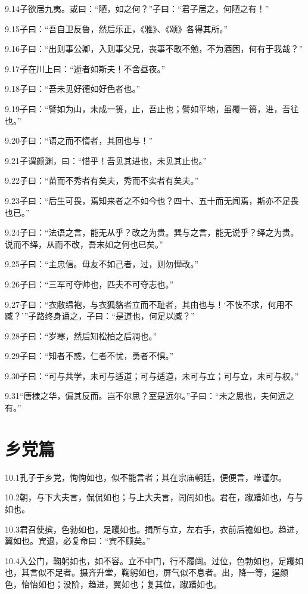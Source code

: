 \documentclass[a4paper,12pt,UTF8,twoside]{ctexbook}
\begin{document}
9.14子欲居九夷。或曰：“陋，如之何？”子曰：“君子居之，何陋之有！”

9.15子曰：“吾自卫反鲁，然后乐正，《雅》、《颂》各得其所。”

9.16子曰：“出则事公卿，入则事父兄，丧事不敢不勉，不为酒困，何有于我哉？”

9.17子在川上曰：“逝者如斯夫！不舍昼夜。”

9.18子曰：“吾未见好德如好色者也。”

9.19子曰：“譬如为山，未成一篑，止，吾止也；譬如平地，虽覆一篑，进，吾往也。”

9.20子曰：“语之而不惰者，其回也与！”

9.21子谓颜渊，曰：“惜乎！吾见其进也，未见其止也。”

9.22子曰：“苗而不秀者有矣夫，秀而不实者有矣夫。”

9.23子曰：“后生可畏，焉知来者之不如今也？四十、五十而无闻焉，斯亦不足畏也已。”

9.24子曰：“法语之言，能无从乎？改之为贵。巽与之言，能无说乎？绎之为贵。说而不绎，从而不改，吾末如之何也已矣。”

9.25子曰：“主忠信。毋友不如己者，过，则勿惮改。”

9.26子曰：“三军可夺帅也，匹夫不可夺志也。”

9.27子曰：“衣敝缊袍，与衣狐貉者立而不耻者，其由也与！‘不忮不求，何用不臧？’”子路终身诵之，子曰：“是道也，何足以臧？”

9.28子曰：“岁寒，然后知松柏之后凋也。”

9.29子曰：“知者不惑，仁者不忧，勇者不惧。”

9.30子曰：“可与共学，未可与适道；可与适道，未可与立；可与立，未可与权。”

9.31“唐棣之华，偏其反而。岂不尔思？室是远尔。”子曰：“未之思也，夫何远之有。”

\chapter{乡党篇}
10.1孔子于乡党，恂恂如也，似不能言者；其在宗庙朝廷，便便言，唯谨尔。

10.2朝，与下大夫言，侃侃如也；与上大夫言，訚訚如也。君在，踧踖如也，与与如也。

10.3君召使摈，色勃如也，足躩如也。揖所与立，左右手，衣前后襜如也。趋进，翼如也。宾退，必复命曰：“宾不顾矣。”

10.4入公门，鞠躬如也，如不容。立不中门，行不履阈。过位，色勃如也，足躩如也，其言似不足者。摄齐升堂，鞠躬如也，屏气似不息者。出，降一等，逞颜
色，怡怡如也；没阶，趋进，翼如也；复其位，踧踖如也。
\end{document}

